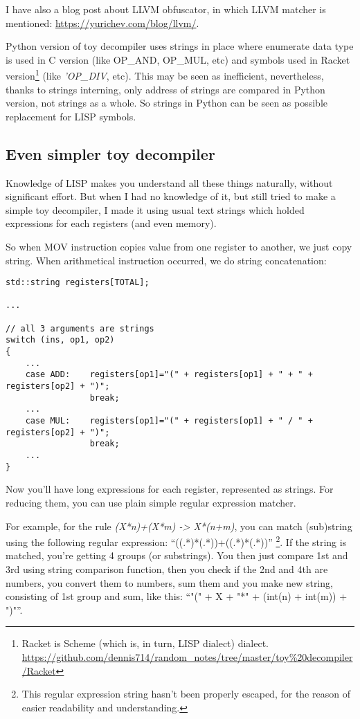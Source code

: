 ﻿\documentclass[12pt]{article}
\begin{document}
I have also a blog post about LLVM obfuscator, in which LLVM matcher is mentioned: \url{https://yurichev.com/blog/llvm/}.

Python version of toy decompiler uses strings in place where enumerate data type is used in C version
(like OP\_AND, OP\_MUL, etc) and
symbols used in Racket version\footnote{Racket is Scheme (which is, in turn, LISP dialect) dialect.
\url{https://github.com/dennis714/random_notes/tree/master/toy\%20decompiler/Racket}} (like \textit{'OP\_DIV}, etc).
This may be seen as inefficient, nevertheless, thanks to strings interning, only address of strings are compared in
Python version, not strings as a whole. So strings in Python can be seen as possible replacement for LISP symbols.

\subsection{Even simpler toy decompiler}

Knowledge of LISP makes you understand all these things naturally, without significant effort.
But when I had no knowledge of it, but still tried to make a simple toy decompiler, I made it using usual text strings
which holded expressions for each registers (and even memory).

So when MOV instruction copies value from one register to another, we just copy string.
When arithmetical instruction occurred, we do string concatenation:

\begin{lstlisting}
std::string registers[TOTAL];

...

// all 3 arguments are strings
switch (ins, op1, op2)
{
    ...
    case ADD:    registers[op1]="(" + registers[op1] + " + " + registers[op2] + ")";
                 break;
    ...
    case MUL:    registers[op1]="(" + registers[op1] + " / " + registers[op2] + ")";
                 break;
    ...
}
\end{lstlisting}

Now you'll have long expressions for each register, represented as strings.
For reducing them, you can use plain simple regular expression matcher.

For example, for the rule \textit{(X*n)+(X*m) -> X*(n+m)}, you can match (sub)string using the following
regular expression: ``((.*)*(.*))+((.*)*(.*))''
\footnote{This regular expression string hasn't been properly escaped,
for the reason of easier readability and understanding.}.
If the string is matched, you're getting 4 groups (or substrings).
You then just compare 1st and 3rd using string comparison function, then you check if
the 2nd and 4th are numbers, you convert them to numbers, sum them and you make new string, consisting
of 1st group and sum, like this: ``"(" + X + "*" + (int(n) + int(m)) + ")"''.
\end{document}
